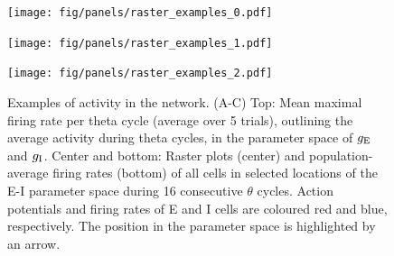 \documentclass[a4paper,12pt]{article}
\newcommand{\ssc}[3]{\ensuremath{#1_{\text{#2}_{\text{#3}}}}}
\newcommand{\gE      }{\ssc{g}      {\scriptsize{E}}{}}
\newcommand{\gI      }{\ssc{g}      {\scriptsize{I}}{}}
\begin{document}
\clearpage

\begin{figure}[p]
    \internallinenumbers
    \centering
    \caption{}
\end{figure}

\clearpage

\begin{figure}[p]
    \centering
        \texttt{[image: fig/panels/raster\_examples\_0.pdf]}
\end{figure}

\begin{figure}[p]
    \centering
        \texttt{[image: fig/panels/raster\_examples\_1.pdf]}
\end{figure}

\begin{figure}[p]
    \centering
        \texttt{[image: fig/panels/raster\_examples\_2.pdf]}
\end{figure}

\clearpage

\setcounter{figure}{0}
\renewcommand{\figurename}{Figure 5 - figure supplement}

\begin{figure}[H]
    \internallinenumbers
    \caption{Examples of activity in the network. (A-C) Top: Mean maximal
    firing rate per theta cycle (average over 5 trials), outlining the average
    activity during theta cycles, in the parameter space of $\gE$ and $\gI$.
    Center and bottom: Raster plots (center) and population-average firing
    rates (bottom) of all cells in selected locations of the E-I parameter
    space during 16 consecutive $\theta$ cycles. Action potentials and firing
    rates of E and I cells are coloured red and blue, respectively. The position
    in the parameter space is highlighted by an arrow.}
\end{figure}
\end{document}
